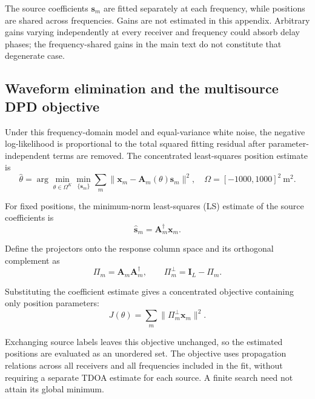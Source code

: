 \documentclass[11pt,a4paper]{article}
\numberwithin{equation}{section}
\numberwithin{figure}{section}
\numberwithin{table}{section}
\begin{document}
The source coefficients $\mathbf{s}_m$ are fitted separately at each frequency, while positions are shared across frequencies. Gains are not estimated in this appendix. Arbitrary gains varying independently at every receiver and frequency could absorb delay phases; the frequency-shared gains in the main text do not constitute that degenerate case.

\subsection{Waveform elimination and the multisource DPD objective}\label{sec:2.3}

Under this frequency-domain model and equal-variance white noise, the negative log-likelihood is proportional to the total squared fitting residual after parameter-independent terms are removed. The concentrated least-squares position estimate is
\begin{equation}\label{eq:2.7}
\widehat{\theta} = \arg\min_{\theta\in\Omega^K} \min_{\{\mathbf{s}_m\}} \sum_m \|\mathbf{x}_m-\mathbf{A}_m(\theta)\mathbf{s}_m\|^2, \quad \Omega=[-1000,1000]^2\ \mathrm{m}^2.
\end{equation}

For fixed positions, the minimum-norm least-squares (LS) estimate of the source coefficients is
\begin{equation}\label{eq:2.8}
\widehat{\mathbf{s}}_m=\mathbf{A}_m^\dagger\mathbf{x}_m.
\end{equation}

Define the projectors onto the response column space and its orthogonal complement as
\begin{equation}\label{eq:2.9}
\Pi_m=\mathbf{A}_m\mathbf{A}_m^\dagger, \qquad \Pi_m^\perp=\mathbf{I}_L-\Pi_m.
\end{equation}

Substituting the coefficient estimate gives a concentrated objective containing only position parameters\cite{ref05}:
\begin{equation}\label{eq:2.10}
J(\theta) =\sum_m\|\Pi_m^\perp\mathbf{x}_m\|^2.
\end{equation}

Exchanging source labels leaves this objective unchanged, so the estimated positions are evaluated as an unordered set. The objective uses propagation relations across all receivers and all frequencies included in the fit, without requiring a separate TDOA estimate for each source. A finite search need not attain its global minimum.
\end{document}

